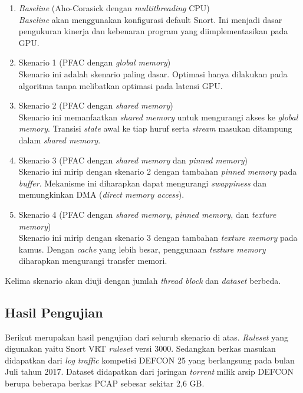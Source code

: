     \begin{enumerate}
      
      \item \emph{Baseline} (Aho-Corasick dengan \emph{multithreading} CPU) \\
      \emph{Baseline} akan menggunakan konfigurasi default Snort. Ini menjadi dasar pengukuran kinerja dan kebenaran program yang diimplementasikan pada GPU.

      \item Skenario 1 (PFAC dengan \emph{global memory}) \\
      Skenario ini adalah skenario paling dasar. Optimasi hanya dilakukan pada algoritma tanpa melibatkan optimasi pada latensi GPU.

      \item Skenario 2 (PFAC dengan \emph{shared memory}) \\
      Skenario ini memanfaatkan \emph{shared memory} untuk mengurangi akses ke \emph{global memory}. Transisi \emph{state} awal ke tiap huruf serta \emph{stream} masukan ditampung dalam \emph{shared memory}.

      \item Skenario 3 (PFAC dengan \emph{shared memory} dan \emph{pinned memory}) \\
      Skenario ini mirip dengan skenario 2 dengan tambahan \emph{pinned memory} pada \emph{buffer}. Mekanisme ini diharapkan dapat mengurangi \emph{swappiness} dan memungkinkan DMA (\emph{direct memory access}).

      \item Skenario 4 (PFAC dengan \emph{shared memory}, \emph{pinned memory}, dan \emph{texture memory}) \\
      Skenario ini mirip dengan skenario 3 dengan tambahan \emph{texture memory} pada kamus. Dengan \emph{cache} yang lebih besar, penggunaan \emph{texture memory} diharapkan mengurangi transfer memori.

    \end{enumerate}

    Kelima skenario akan diuji dengan jumlah \emph{thread block} dan \emph{dataset} berbeda.

  \subsection{Hasil Pengujian}

    Berikut merupakan hasil pengujian dari seluruh skenario di atas. \emph{Ruleset} yang digunakan yaitu Snort VRT \emph{ruleset} versi 3000. Sedangkan berkas masukan didapatkan dari \emph{log traffic} kompetisi DEFCON 25 yang berlangsung pada bulan Juli tahun 2017. Dataset didapatkan dari jaringan \emph{torrent} milik arsip DEFCON berupa beberapa berkas PCAP sebesar sekitar 2,6 GB.

